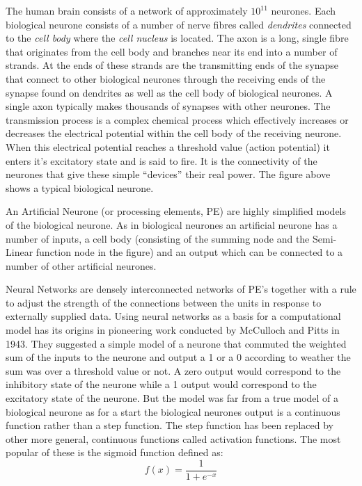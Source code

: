 \documentclass[a4paper,12pt,notitlepage,pdftex]{scrreprt}
\begin{document}
            The human brain consists of a network of approximately $10^{11}$ neurones.
            Each biological neurone consists of a number of nerve fibres called \textit{dendrites} connected to the
            \textit{cell body} where the \textit{cell nucleus} is located.
            The axon is a long, single fibre that originates from the cell body and branches near its end into a
            number of strands.
            At the ends of these strands are the transmitting ends of the synapse that connect to other biological
            neurones through the receiving ends of the synapse found on dendrites as well as the cell body of
            biological neurones.
            A single axon typically makes thousands of synapses with other neurones.
            The transmission process is a complex chemical process which effectively increases or decreases the
            electrical potential within the cell body of the receiving neurone.
            When this electrical potential reaches a threshold value (action potential) it enters it's excitatory
            state and is said to fire.
            It is the connectivity of the neurones that give these simple ``devices'' their real power.
            The figure above shows a typical biological neurone.

            An Artificial Neurone (or processing elements, PE) are highly simplified models of the biological neurone.
            As in biological neurones an artificial neurone has a number of inputs, a cell body (consisting of the
            summing node and the Semi-Linear function node in the figure) and an output which can be connected to a
            number of other artificial neurones.

            Neural Networks are densely interconnected networks of PE's together with a rule to adjust the strength of
            the connections between the units in response to externally supplied data.
            Using neural networks as a basis for a computational model has its origins in pioneering work conducted by
            McCulloch and Pitts in 1943.
            They suggested a simple model of a neurone that commuted the weighted sum of the inputs to the neurone and
            output a 1 or a 0 according to weather the sum was over a threshold value or not.
            A zero output would correspond to the inhibitory state of the neurone while a 1 output would correspond to
            the excitatory state of the neurone.
            But the model was far from a true model of a biological neurone as for a start the biological neurones
            output is a continuous function rather than a step function.
            The step function has been replaced by other more general, continuous functions called activation functions.
            The most popular of these is the sigmoid function defined as:
            $$ f\left( x \right) = \frac{1}{1+e^{-x}} $$
\end{document}
